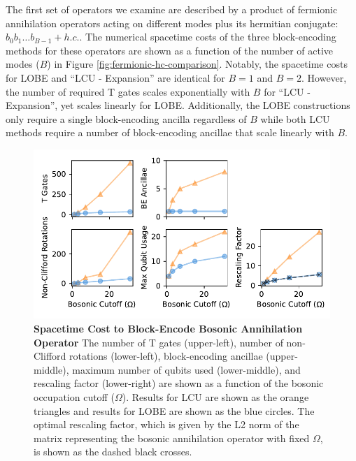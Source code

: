 The first set of operators we examine are described by a product of fermionic annihilation operators acting on different modes plus its hermitian conjugate: $b_0 b_1 \hdots b_{B-1} + h.c.$.
The numerical spacetime costs of the three block-encoding methods for these operators are shown as a function of the number of active modes ($B$) in Figure \ref{fig:fermionic-hc-comparison}.
Notably, the spacetime costs for LOBE and ``LCU - Expansion'' are identical for $B = 1$ and $B = 2$.
However, the number of required T gates scales exponentially with $B$ for ``LCU - Expansion'', yet scales linearly for LOBE.
Additionally, the LOBE constructions only require a single block-encoding ancilla regardless of $B$ while both LCU methods require a number of block-encoding ancillae that scale linearly with $B$.

\begin{figure}
    \centering
    \includegraphics[width=14cm]{figures/bosonic-comparison.pdf}
    \caption{
        \textbf{Spacetime Cost to Block-Encode Bosonic Annihilation Operator}
        The number of T gates (upper-left), number of non-Clifford rotations (lower-left), block-encoding ancillae (upper-middle), maximum number of qubits used (lower-middle), and rescaling factor (lower-right) are shown as a function of the bosonic occupation cutoff ($\Omega$).
        Results for LCU are shown as the orange triangles and results for LOBE are shown as the blue circles.
        The optimal rescaling factor, which is given by the L2 norm of the matrix representing the bosonic annihilation operator with fixed $\Omega$, is shown as the dashed black crosses. 
    }
    \label{fig:bosonic-comparison}
\end{figure}

